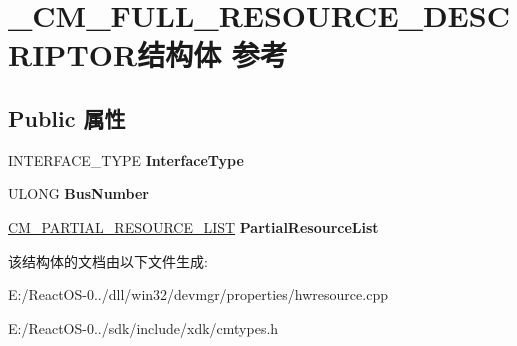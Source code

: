 \hypertarget{struct___c_m___f_u_l_l___r_e_s_o_u_r_c_e___d_e_s_c_r_i_p_t_o_r}{}\section{\+\_\+\+C\+M\+\_\+\+F\+U\+L\+L\+\_\+\+R\+E\+S\+O\+U\+R\+C\+E\+\_\+\+D\+E\+S\+C\+R\+I\+P\+T\+O\+R结构体 参考}
\label{struct___c_m___f_u_l_l___r_e_s_o_u_r_c_e___d_e_s_c_r_i_p_t_o_r}
\subsection*{Public 属性}
\begin{DoxyCompactItemize}
\item 
\mbox{\label{struct___c_m___f_u_l_l___r_e_s_o_u_r_c_e___d_e_s_c_r_i_p_t_o_r_a5ae3386856c5454b932d13d24e896cd3}} 
I\+N\+T\+E\+R\+F\+A\+C\+E\+\_\+\+T\+Y\+PE {\bfseries Interface\+Type}
\item 
\mbox{\label{struct___c_m___f_u_l_l___r_e_s_o_u_r_c_e___d_e_s_c_r_i_p_t_o_r_acf9841d5ea3220cb5159365a1f4d6f84}} 
U\+L\+O\+NG {\bfseries Bus\+Number}
\item 
\mbox{\label{struct___c_m___f_u_l_l___r_e_s_o_u_r_c_e___d_e_s_c_r_i_p_t_o_r_a1ad7981f02548aa1992309a9c862d396}} 
\hyperlink{struct___c_m___p_a_r_t_i_a_l___r_e_s_o_u_r_c_e___l_i_s_t}{C\+M\+\_\+\+P\+A\+R\+T\+I\+A\+L\+\_\+\+R\+E\+S\+O\+U\+R\+C\+E\+\_\+\+L\+I\+ST} {\bfseries Partial\+Resource\+List}
\end{DoxyCompactItemize}


该结构体的文档由以下文件生成\+:\begin{DoxyCompactItemize}
\item 
E\+:/\+React\+O\+S-\/0../dll/win32/devmgr/properties/hwresource.\+cpp\item 
E\+:/\+React\+O\+S-\/0../sdk/include/xdk/cmtypes.\+h\end{DoxyCompactItemize}
